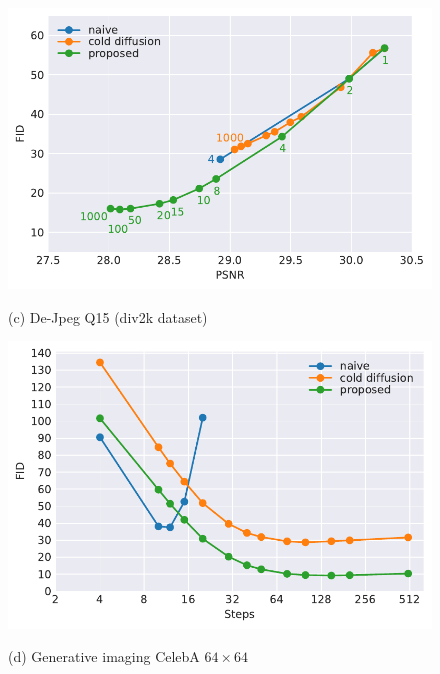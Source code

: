 \begin{figure}[t]
    \vspace{.5em}
    \begin{minipage}[c]{.48\textwidth}
    \centering
    \includegraphics[width=0.95\linewidth]{assets/pd_curve_dejpeg_q15_sampler.pdf}

        (c) De-Jpeg Q15 (div2k dataset) \vspace{-.5em}

    \end{minipage}
    \begin{minipage}[c]{.48\textwidth}
    \centering
    \includegraphics[width=0.95\linewidth]{assets/fid_celebA_gen_sampler.pdf}

     (d) Generative imaging CelebA $64\times64$

    \end{minipage}
    
    
    

    


\end{figure}

